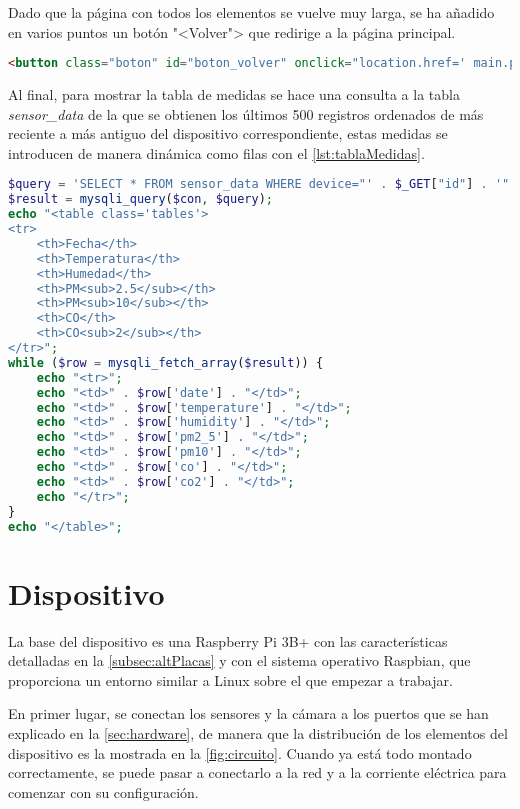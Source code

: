 Dado que la página con todos los elementos se vuelve muy larga, se ha añadido en varios puntos un botón "<Volver"> que redirige a la página principal.
\begin{lstlisting}[language=HTML, caption=Botón de retorno a página principal, label=lst:botonVolver]
<button class="boton" id="boton_volver" onclick="location.href=' main.php'">Volver</button>
\end{lstlisting}

Al final, para mostrar la tabla de medidas se hace una consulta a la tabla \textit{sensor\_data} de la que se obtienen los últimos 500 registros ordenados de más reciente a más antiguo del dispositivo correspondiente, estas medidas se introducen de manera dinámica como filas con el \autoref{lst:tablaMedidas}.
\begin{lstlisting}[language=PHP, caption=Visualización tabular de las medidas del dispositivo, label=lst:tablaMedidas]
$query = 'SELECT * FROM sensor_data WHERE device="' . $_GET["id"] . '" ORDER BY date DESC LIMIT 500';
$result = mysqli_query($con, $query);
echo "<table class='tables'>
<tr>
    <th>Fecha</th>
    <th>Temperatura</th>
    <th>Humedad</th>
    <th>PM<sub>2.5</sub></th>
    <th>PM<sub>10</sub></th>
    <th>CO</th>
    <th>CO<sub>2</sub></th>
</tr>";
while ($row = mysqli_fetch_array($result)) {
    echo "<tr>";
    echo "<td>" . $row['date'] . "</td>";
    echo "<td>" . $row['temperature'] . "</td>";
    echo "<td>" . $row['humidity'] . "</td>";
    echo "<td>" . $row['pm2_5'] . "</td>";
    echo "<td>" . $row['pm10'] . "</td>";
    echo "<td>" . $row['co'] . "</td>";
    echo "<td>" . $row['co2'] . "</td>";
    echo "</tr>";
}
echo "</table>";
\end{lstlisting}

\section{Dispositivo}\label{sec:implDispositivo}
La base del dispositivo es una Raspberry Pi 3B+ con las características detalladas en la \autoref{subsec:altPlacas} y con el sistema operativo Raspbian, que proporciona un entorno similar a Linux sobre el que empezar a trabajar.

En primer lugar, se conectan los sensores y la cámara a los puertos que se han explicado en la \autoref{sec:hardware}, de manera que la distribución de los elementos del dispositivo es la mostrada en la \autoref{fig:circuito}. Cuando ya está todo montado correctamente, se puede pasar a conectarlo a la red y a la corriente eléctrica para comenzar con su configuración.


